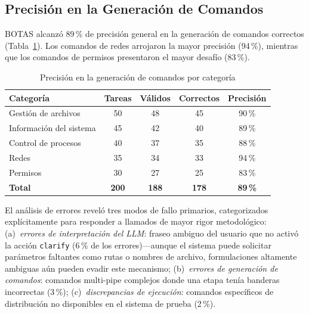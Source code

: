 \documentclass[10pt,a4paper]{article}
\begin{document}
\subsection{Precisi\'{o}n en la Generaci\'{o}n de Comandos}
\label{subsec:results-accuracy}

BOTAS alcanz\'{o} 89\,\% de precisi\'{o}n general en la generaci\'{o}n de comandos correctos (Tabla~\ref{tab:accuracy}). Los comandos de redes arrojaron la mayor precisi\'{o}n (94\,\%), mientras que los comandos de permisos presentaron el mayor desaf\'{i}o (83\,\%).

\begin{table}[H]
    \centering
    \caption{Precisi\'{o}n en la generaci\'{o}n de comandos por categor\'{i}a}
    \label{tab:accuracy}
    \begin{tabular}{@{}lcccc@{}}
        \toprule
        \textbf{Categor\'{i}a} & \textbf{Tareas} & \textbf{V\'{a}lidos} & \textbf{Correctos} & \textbf{Precisi\'{o}n} \\
        \midrule
        Gesti\'{o}n de archivos        & 50 & 48 & 45 & 90\,\% \\
        Informaci\'{o}n del sistema    & 45 & 42 & 40 & 89\,\% \\
        Control de procesos        & 40 & 37 & 35 & 88\,\% \\
        Redes                      & 35 & 34 & 33 & 94\,\% \\
        Permisos                   & 30 & 27 & 25 & 83\,\% \\
        \midrule
        \textbf{Total}             & \textbf{200} & \textbf{188} & \textbf{178} & \textbf{89\,\%} \\
        \bottomrule
    \end{tabular}
\end{table}

El an\'{a}lisis de errores revel\'{o} tres modos de fallo primarios, categorizados expl\'{i}citamente para responder a llamados de mayor rigor metodol\'{o}gico: (a)~\textit{errores de interpretaci\'{o}n del LLM}: fraseo ambiguo del usuario que no activ\'{o} la acci\'{o}n \texttt{clarify} (6\,\% de los errores)---aunque el sistema puede solicitar par\'{a}metros faltantes como rutas o nombres de archivo, formulaciones altamente ambiguas a\'{u}n pueden evadir este mecanismo; (b)~\textit{errores de generaci\'{o}n de comandos}: comandos multi-pipe complejos donde una etapa ten\'{i}a banderas incorrectas (3\,\%); (c)~\textit{discrepancias de ejecuci\'{o}n}: comandos espec\'{i}ficos de distribuci\'{o}n no disponibles en el sistema de prueba (2\,\%).
\end{document}
